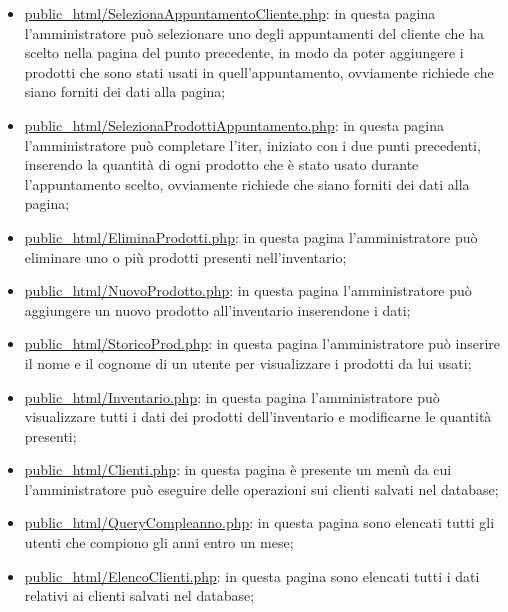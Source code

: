 {\begin{itemize}
		\item \underline{public\_html/SelezionaAppuntamentoCliente.php}: in questa pagina l'amministratore può selezionare uno degli appuntamenti del cliente che ha scelto nella pagina del punto precedente, in modo da poter aggiungere i prodotti che sono stati usati in quell'appuntamento, ovviamente richiede che siano forniti dei dati alla pagina;
		\item \underline{public\_html/SelezionaProdottiAppuntamento.php}: in questa pagina l'amministratore può completare l'iter, iniziato con i due punti precedenti, inserendo la quantità di ogni prodotto che è stato usato durante l'appuntamento scelto, ovviamente richiede che siano forniti dei dati alla pagina;
		\item \href{http://tecnologie-web.studenti.math.unipd.it/tecweb/~pgabelli/public\_html/EliminaProdotti.php}{public\_html/EliminaProdotti.php}: in questa pagina l'amministratore può eliminare uno o più prodotti presenti nell'inventario;
		\item \href{http://tecnologie-web.studenti.math.unipd.it/tecweb/~pgabelli/public\_html/NuovoProdotto.php}{public\_html/NuovoProdotto.php}: in questa pagina l'amministratore può aggiungere un nuovo prodotto all'inventario inserendone i dati;
		\item \href{http://tecnologie-web.studenti.math.unipd.it/tecweb/~pgabelli/public\_html/StoricoProd.php}{public\_html/StoricoProd.php}: in questa pagina l'amministratore può inserire il nome e il cognome di un utente per visualizzare i prodotti da lui usati;
		\item \href{http://tecnologie-web.studenti.math.unipd.it/tecweb/~pgabelli/public\_html/Inventario.php}{public\_html/Inventario.php}: in questa pagina l'amministratore può visualizzare tutti i dati dei prodotti dell'inventario e modificarne le quantità presenti;
		\item \href{http://tecnologie-web.studenti.math.unipd.it/tecweb/~pgabelli/public\_html/Clienti.php}{public\_html/Clienti.php}: in questa pagina è presente un menù da cui l'amministratore può eseguire delle operazioni sui clienti salvati nel database;
		\item \href{http://tecnologie-web.studenti.math.unipd.it/tecweb/~pgabelli/public\_html/QueryCompleanno.php}{public\_html/QueryCompleanno.php}: in questa pagina sono elencati tutti gli utenti che compiono gli anni entro un mese;
		\item \href{http://tecnologie-web.studenti.math.unipd.it/tecweb/~pgabelli/public\_html/ElencoClienti.php}{public\_html/ElencoClienti.php}: in questa pagina sono elencati tutti i dati relativi ai clienti salvati nel database;

\end{itemize}}
